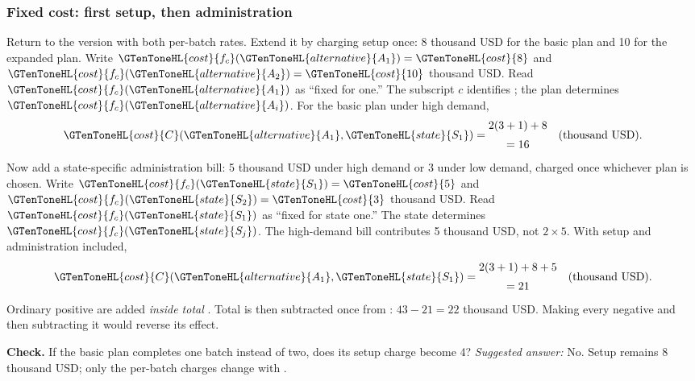 \subsubsection*{Fixed cost: first setup, then administration}
Return to the version with both per-batch  rates. Extend it by charging
setup once: 8 thousand USD for the basic plan and 10 for the expanded plan.
Write \(\GTenToneHL{cost}{f_c}(\GTenToneHL{alternative}{A_1})=\GTenToneHL{cost}{8}\) and \(\GTenToneHL{cost}{f_c}(\GTenToneHL{alternative}{A_2})=\GTenToneHL{cost}{10}\) thousand USD. Read \(\GTenToneHL{cost}{f_c}(\GTenToneHL{alternative}{A_1})\)
as ``fixed  for  one.'' The subscript \(c\) identifies ;
the plan determines \(\GTenToneHL{cost}{f_c}(\GTenToneHL{alternative}{A_i})\). For the basic plan under high demand,
\[
\GTenToneHL{cost}{C}(\GTenToneHL{alternative}{A_1},\GTenToneHL{state}{S_1})=\begin{gathered}2(3+1)+8\\[2pt]=16\end{gathered}\quad\text{(thousand USD).}
\]
Now add a state-specific administration bill: 5 thousand USD under high
demand or 3 under low demand, charged once whichever plan is chosen.
Write \(\GTenToneHL{cost}{f_c}(\GTenToneHL{state}{S_1})=\GTenToneHL{cost}{5}\) and \(\GTenToneHL{cost}{f_c}(\GTenToneHL{state}{S_2})=\GTenToneHL{cost}{3}\) thousand USD. Read \(\GTenToneHL{cost}{f_c}(\GTenToneHL{state}{S_1})\)
as ``fixed  for state one.'' The state determines \(\GTenToneHL{cost}{f_c}(\GTenToneHL{state}{S_j})\).
The high-demand bill contributes 5 thousand USD, not \(2\times5\).
With setup and administration included,
\[
\GTenToneHL{cost}{C}(\GTenToneHL{alternative}{A_1},\GTenToneHL{state}{S_1})=\begin{gathered}2(3+1)+8+5\\[2pt]=21\end{gathered}\quad\text{(thousand USD).}
\]
Ordinary positive  are added \emph{inside total }. Total  is
then subtracted once from : \(43-21=22\) thousand USD. Making every
 negative and then subtracting it would reverse its effect.

\textbf{Check.} If the basic plan completes one batch instead of two, does
its setup charge become 4? \textit{Suggested answer:} No. Setup remains
8 thousand USD; only the per-batch charges change with .

